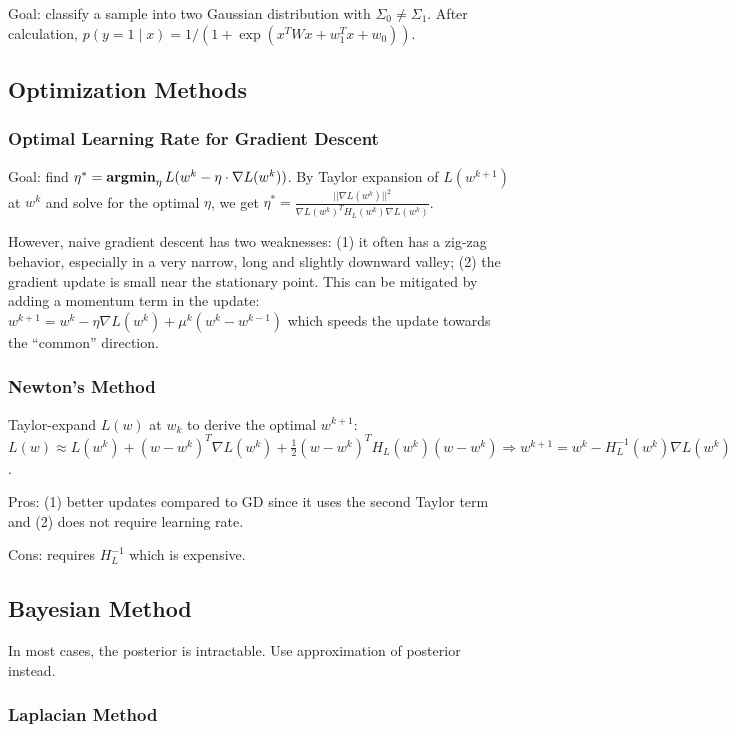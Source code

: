 Goal: classify a sample into two Gaussian distribution with $\Sigma_0 \ne \Sigma_1$.
After calculation, $p(y=1\mid x) = 1/(1+\exp(x^T W x + w_1^T x +w_0))$.

\subsection*{Optimization Methods}

\subsubsection*{Optimal Learning Rate for Gradient Descent}

Goal: find $\eta^* = \operatorname{\textbf{argmin}}_\eta L(w^k - \eta\cdot \nabla L(w^k))$. By Taylor expansion of $L(w^{k+1})$ at $w^k$ and solve for the optimal $\eta$, we get $\eta^* = \frac{||\nabla L(w^k)||^2}{\nabla L(w^k)^T H_L(w^k) \nabla L(w^k)}$.

However, naive gradient descent has two weaknesses: (1) it often has a zig-zag behavior, especially in a very narrow, long and slightly downward valley; (2) the gradient update is small near the stationary point. This can be mitigated by adding a momentum term in the update: $w^{k+1} = w^k -\eta \nabla L(w^k) + \mu^k (w^k -w^{k-1})$ which speeds the update towards the ``common'' direction.

\subsubsection*{Newton's Method}

Taylor-expand $L(w)$ at $w_k$ to derive the optimal $w^{k+1}$: $L(w) \approx L(w^k) + (w-w^k)^T \nabla L(w^k) + \frac{1}{2}(w-w^k)^T H_L(w^k) (w-w^k) \Rightarrow w^{k+1} = w^k - H_L^{-1}(w^k)\nabla L(w^k)$. 

Pros: (1) better updates compared to GD since it uses the second Taylor term and (2) does not require learning rate.

Cons: requires $H_L^{-1}$ which is expensive.

\subsection*{Bayesian Method}

In most cases, the posterior is intractable. Use approximation of posterior instead.

\subsubsection*{Laplacian Method}

